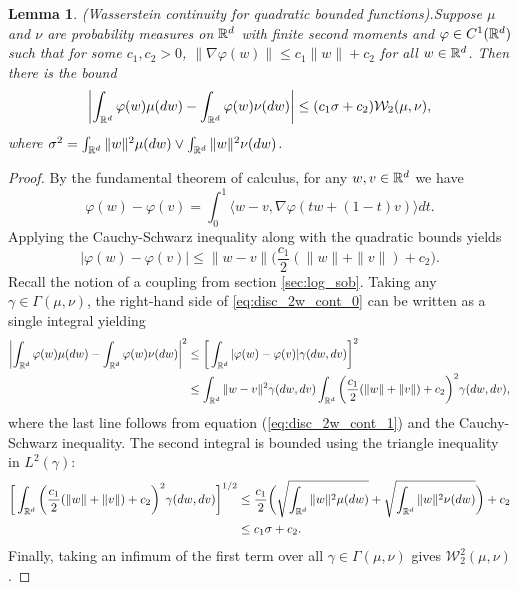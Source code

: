 \documentclass{article}
\newtheorem{lemma}[theorem]{Lemma}
\newcommand{\Bcal}[1]{\mathcal{#1}}
\begin{document}
\begin{lemma}{(Wasserstein continuity for quadratic bounded functions).}\label{lem:disc_2w_cont}
Suppose \(\mu\) and \(\nu\) are probability measures on \(\Bbb{R}^d\) with finite second moments and \(\varphi \in C^1(\Bbb{R}^d)\) such that for some \(c_1, c_2 > 0\), \(\|\nabla \varphi(w)\| \leq c_1 \|w\| + c_2\) for all \(w \in \Bbb{R}^d\). Then there is the bound
\begin{equation}\label{eq:disc_2w_cont_0}
    \left | \int_{\Bbb{R}^d} \varphi(w) \mu(dw) - \int_{\Bbb{R}^d} \varphi(w) \nu(dw) \right | \leq (c_1 \sigma + c_2) \Bcal{W}_2(\mu, \nu),
\end{equation}
where \(\sigma^2 = \int_{\Bbb{R}^d} \|w\|^2 \mu(dw) \lor \int_{\Bbb{R}^d} \|w\|^2 \nu(dw)\).
\end{lemma}
\begin{proof}
By the fundamental theorem of calculus, for any \(w, v \in \Bbb{R}^d\) we have
\begin{equation*}
    \varphi(w) - \varphi(v) = \int_0^1 \langle w - v, \nabla \varphi(tw + (1-t) v) \rangle dt.
\end{equation*}
Applying the Cauchy-Schwarz inequality along with the quadratic bounds yields
\begin{equation}\label{eq:disc_2w_cont_1}
    |\varphi(w) - \varphi(v)| \leq \|w - v\| \bigg ( \frac{c_1}{2} (\|w\| + \|v\|) + c_2 \bigg ).
\end{equation}
Recall the notion of a coupling from section \ref{sec:log_sob}. Taking any \(\gamma \in \Gamma(\mu, \nu)\), the right-hand side of \ref{eq:disc_2w_cont_0} can be written as a single integral yielding
\begin{align*}
    \left | \int_{\Bbb{R}^d} \varphi(w) \mu(dw) - \int_{\Bbb{R}^d} \varphi(w) \nu(dw) \right |^2 &\leq \bigg [ \int_{\Bbb{R}^d} |\varphi(w) - \varphi(v)| \gamma(dw, dv) \bigg ]^2\\
    &\leq \int_{\Bbb{R}^d} \|w - v\|^2 \gamma(dw, dv) \int_{\Bbb{R}^d} \bigg ( \frac{c_1}{2} (\|w\| + \|v\|) + c_2 \bigg )^2 \gamma(dw, dv),
\end{align*}
where the last line follows from equation (\ref{eq:disc_2w_cont_1}) and the Cauchy-Schwarz inequality. The second integral is bounded using the triangle inequality in \(L^2(\gamma)\):
\begin{align*}
    \bigg [ \int_{\Bbb{R}^d} \bigg ( \frac{c_1}{2} (\|w\| + \|v\|) + c_2 \bigg )^2 \gamma(dw, dv) \bigg ]^{1/2} &\leq \frac{c_1}{2} \bigg ( \sqrt{\int_{\Bbb{R}^d} \|w\|^2 \mu(dw)} + \sqrt{\int_{\Bbb{R}^d} \|w\|^2 \nu(dw)} \bigg ) + c_2\\
    &\leq c_1 \sigma + c_2.
\end{align*}
Finally, taking an infimum of the first term over all \(\gamma \in \Gamma(\mu, \nu)\) gives \(\Bcal{W}_2^2(\mu, \nu)\).
\end{proof}
\end{document}
